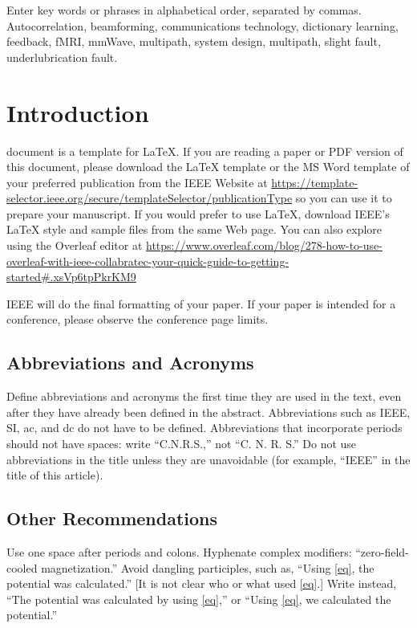 \documentclass{ieeeaccess}
\begin{document}
\begin{keywords}
Enter key words or phrases in alphabetical
order, separated by commas. Autocorrelation, beamforming, communications technology, dictionary learning, feedback, fMRI, mmWave, multipath, system design, multipath, slight fault, underlubrication fault.
\end{keywords}

\titlepgskip=-21pt

\maketitle

\section{Introduction}
\label{sec:introduction}
 document is a template for \LaTeX. If you are reading a paper or PDF version of this document, please download the LaTeX template or the MS Word
template of your preferred publication from the IEEE Website at \underline
{https://template-selector.ieee.org/secure/templateSelec}\break\underline{tor/publicationType} so you can use it to prepare your manuscript.
If you would prefer to use LaTeX, download IEEE's LaTeX style and sample files
from the same Web page. You can also explore using the Overleaf editor at
\underline
{https://www.overleaf.com/blog/278-how-to-use-overleaf-}\break\underline{with-ieee-collabratec-your-quick-guide-to-getting-started}\break\underline{\#.xsVp6tpPkrKM9}

IEEE will do the final formatting of your paper. If your paper is intended
for a conference, please observe the conference page limits.

\subsection{Abbreviations and Acronyms}
Define abbreviations and acronyms the first time they are used in the text,
even after they have already been defined in the abstract. Abbreviations
such as IEEE, SI, ac, and dc do not have to be defined. Abbreviations that
incorporate periods should not have spaces: write ``C.N.R.S.,'' not ``C. N.
R. S.'' Do not use abbreviations in the title unless they are unavoidable
(for example, ``IEEE'' in the title of this article).

\subsection{Other Recommendations}
Use one space after periods and colons. Hyphenate complex modifiers:
``zero-field-cooled magnetization.'' Avoid dangling participles, such as,
``Using \eqref{eq}, the potential was calculated.'' [It is not clear who or what
used \eqref{eq}.] Write instead, ``The potential was calculated by using \eqref{eq},'' or
``Using \eqref{eq}, we calculated the potential.''
\end{document}
